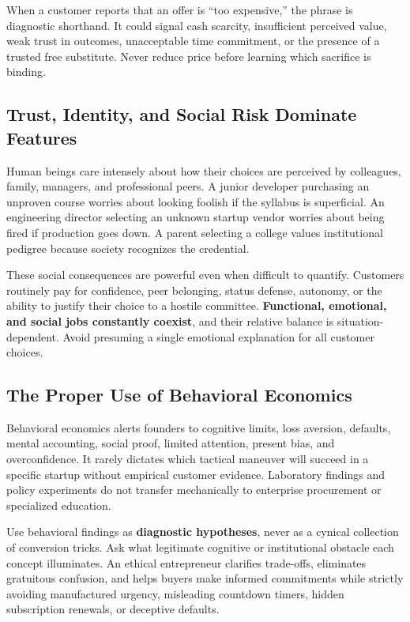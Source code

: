 When a customer reports that an offer is ``too expensive,'' the phrase is diagnostic shorthand. It could signal cash scarcity, insufficient perceived value, weak trust in outcomes, unacceptable time commitment, or the presence of a trusted free substitute. Never reduce price before learning which sacrifice is binding.

\subsection{Trust, Identity, and Social Risk Dominate Features}

Human beings care intensely about how their choices are perceived by colleagues, family, managers, and professional peers. A junior developer purchasing an unproven course worries about looking foolish if the syllabus is superficial. An engineering director selecting an unknown startup vendor worries about being fired if production goes down. A parent selecting a college values institutional pedigree because society recognizes the credential.

These social consequences are powerful even when difficult to quantify. Customers routinely pay for confidence, peer belonging, status defense, autonomy, or the ability to justify their choice to a hostile committee. \textbf{Functional, emotional, and social jobs constantly coexist}, and their relative balance is situation-dependent. Avoid presuming a single emotional explanation for all customer choices.

\subsection{The Proper Use of Behavioral Economics}

Behavioral economics alerts founders to cognitive limits, loss aversion, defaults, mental accounting, social proof, limited attention, present bias, and overconfidence. It rarely dictates which tactical maneuver will succeed in a specific startup without empirical customer evidence. Laboratory findings and policy experiments do not transfer mechanically to enterprise procurement or specialized education.

Use behavioral findings as \textbf{diagnostic hypotheses}, never as a cynical collection of conversion tricks. Ask what legitimate cognitive or institutional obstacle each concept illuminates. An ethical entrepreneur clarifies trade-offs, eliminates gratuitous confusion, and helps buyers make informed commitments while strictly avoiding manufactured urgency, misleading countdown timers, hidden subscription renewals, or deceptive defaults.

